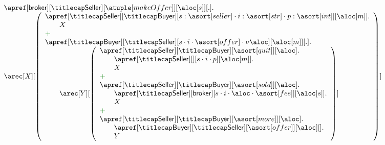 %
\begin{example}[Auction]
\[
  \begin{array}{l}
    \apref[\ptp {broker}][\amulti {Seller}][{\atuple[makeOffer]}][{\aloc[s]}][.].
    \\  	
    \arec[X][\left({
    \begin{array}{l}
      \apref[\amulti{Seller}][\amulti {Buyer}][s:{\asort[seller]} \cdot {i:{\asort[str]} \cdot p:{\asort[int]}}][{\aloc[m]}].
      \\\qquad
      X
      \\
      \chop
      \\
      \apref[\amulti {Buyer}][\amulti {Seller}][s \cdot i \cdot {\asort[offer]} \cdot \nu \aloc][{\aloc[m]}][.].
      \\\qquad
      \arec[Y][\left({
      \begin{array}{l}
	\apref[\amulti {Seller}][\amulti {Buyer}][{\asort[quit]}][\aloc].
	\\\qquad
	\apref[\amulti {Seller}][][s \cdot i \cdot p][{\aloc[m]}].
        \\
        \qquad
        X
        \\
        \chop
	\\
        \apref[\amulti{Seller}][\amulti {Buyer}][{\asort[sold]}][\aloc].
        \\\qquad
        \apref[\amulti{Seller}][\ptp{broker}][s \cdot i \cdot \aloc \cdot {\asort[fee]}][{\aloc[s]}].        
        \\
        \qquad
        X
	\\
        \chop
	\\
        \apref[\amulti {Seller}][\amulti {Buyer}][{\asort[more]}][\aloc].
        \\
        \qquad\apref[\amulti {Buyer}][\amulti {Seller}][{\asort[offer]}][{\aloc}][].
	\\
        \qquad	
	Y
      \end{array}
      } \right)]
    \end{array}
    }\right)]
    \\
  \end{array}
\]
\finex
\end{example}

